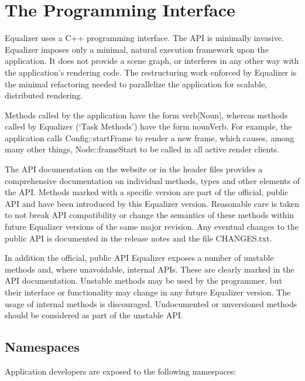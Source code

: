 \documentclass[10pt,a4]{scrartcl}
\begin{document}
\section{The Programming Interface}

Equalizer uses a C++ programming interface. The API is minimally
invasive. Equalizer imposes only a minimal, natural execution framework upon the
application. It does not provide a scene graph, or interferes in any other way
with the application's rendering code. The restructuring work enforced by
Equalizer is the minimal refactoring needed to parallelize the application for
scalable, distributed rendering.

Methods called by the application have the form \textsf{verb[Noun]},
whereas methods called by Equalizer (`Task Methods') have the form
\textsf{nounVerb}. For example, the application calls
\textsf{Config::startFrame} to render a new frame, which causes, among
many other things, \textsf{Node::frameStart} to be called in all active
render clients.

The API documentation on the website or in the header files provides a
comprehensive documentation on individual methods, types and other elements of
the API. Methods marked with a specific version are part of the official, public
API and have been introduced by this Equalizer version. Reasonable care is taken
to not break API compatibility or change the semantics of these methods within
future Equalizer versions of the same major revision. Any eventual changes to
the public API is documented in the release notes and the file
\textsf{CHANGES.txt}.

In addition the official, public API Equalizer exposes a number of
unstable methods and, where unavoidable, internal APIs. These are clearly marked
in the API documentation. Unstable methods may be used by the programmer, but
their interface or functionality may change in any future Equalizer version. The
usage of internal methods is discouraged. Undocumented or unversioned methods
should be considered as part of the unstable API.

\subsection{\label{sNamespaces}Namespaces}

Application developers are exposed to the following namespaces:
\end{document}
